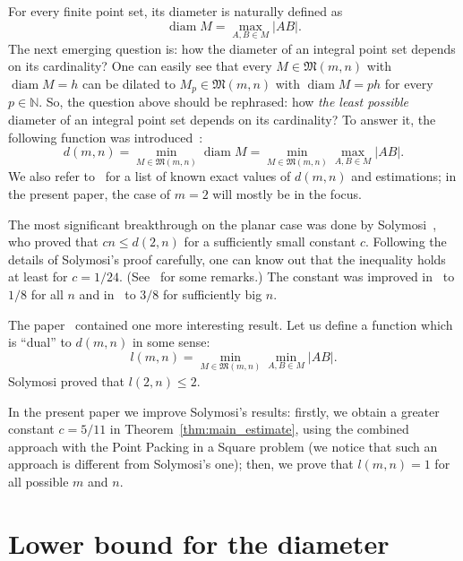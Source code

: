 \documentclass[a4paper,14pt]{article} %
\theoremstyle{plain}
\theoremstyle{definition}
\begin{document}
For every finite point set, its diameter is naturally defined as
\begin{equation}
	\operatorname{diam} M = \max_{A,B\in M} |AB|
	.
\end{equation}
The next emerging question is: how the diameter of an integral point set depends on its cardinality?
One can easily see that every $M\in\mathfrak{M}(m,n)$ with $\operatorname{diam} M = h$
can be dilated to $M_p\in\mathfrak{M}(m,n)$ with $\operatorname{diam} M = ph$
for every $p\in\mathbb{N}$.
So, the question above should be rephrased:
how \textit{the least possible} diameter of an integral point set depends on its cardinality?
To answer it, the following function was introduced~\cite{kurz2008bounds,kurz2008minimum}:
\begin{equation}
	d(m,n) = \min_{M\in\mathfrak{M}(m,n)} \operatorname{diam} M = \min_{M\in\mathfrak{M}(m,n)} \max_{A,B\in M} |AB|
	.
\end{equation}
We also refer to~\cite{kurz2008bounds} for a list of known exact values of $d(m,n)$
and estimations; in the present paper, the case of $m=2$ will mostly be in the focus.

The most significant breakthrough on the planar case was done by Solymosi~\cite{solymosi2003note},
who proved that $cn \leq d(2,n)$ for a sufficiently small constant $c$.
Following the details of Solymosi's proof carefully,
one can know out that the inequality holds at least for $c = 1/24$.
(See~\cite[Exercise 2.6]{garibaldi2005erdos} for some remarks.)
The constant was improved in~\cite{our-mz-rus} to $1/8$ for all $n$ and in~\cite{our-vmmsh-2018}
to $3/8$ for sufficiently big $n$.

The paper~\cite{solymosi2003note} contained one more interesting result.
Let us define a function which is ``dual'' to $d(m,n)$ in some sense:
\begin{equation}
	l(m,n) = \min_{M\in\mathfrak{M}(m,n)} \min_{A,B\in M} |AB|
	.
\end{equation}
Solymosi proved that $l(2,n)\leq 2$.

In the present paper we improve Solymosi's results:
firstly, we obtain a greater constant $c = 5/11$ in Theorem~\ref{thm:main_estimate},
using the combined approach with the Point Packing in a Square problem
(we notice that such an approach is different from Solymosi's one);
then, we prove that $l(m,n)=1$ for all possible $m$ and $n$.

\section{Lower bound for the diameter}
\end{document}
